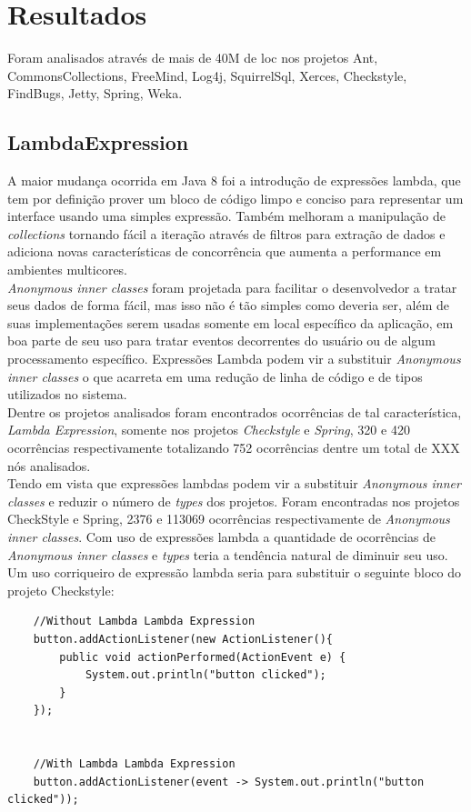 \chapter {Resultados}
Foram analisados através de mais de 40M de loc nos projetos Ant, CommonsCollections, FreeMind, Log4j, SquirrelSql, Xerces, Checkstyle, FindBugs, Jetty, Spring, Weka.\\

\section{LambdaExpression}
A maior mudança ocorrida em Java 8 foi a introdução de expressões lambda, que tem por definição prover um bloco de código limpo e conciso para representar um interface usando uma simples expressão. Também melhoram a manipulação de \textit{collections} tornando fácil a iteração através de filtros para extração de dados e adiciona novas características de concorrência que aumenta a performance em ambientes multicores.\\

\textit{Anonymous inner classes} foram projetada para facilitar o desenvolvedor a tratar seus dados de forma fácil, mas isso não é tão simples como deveria ser, além de suas implementações serem usadas somente em local específico da aplicação, em boa parte de seu uso para tratar eventos decorrentes do usuário ou de algum processamento específico. Expressões Lambda podem vir a substituir \textit{Anonymous inner classes} o que acarreta em uma redução de linha de código e de tipos utilizados no sistema.\\

Dentre os projetos analisados foram encontrados ocorrências de tal característica, \textit{Lambda Expression}, somente nos projetos \textit{Checkstyle} e \textit{Spring}, 320 e 420 ocorrências respectivamente totalizando 752 ocorrências dentre um total de XXX nós analisados.\\

Tendo em vista que expressões lambdas podem vir a substituir \textit{Anonymous inner classes} e reduzir o número de \textit{types} dos projetos. Foram encontradas nos projetos CheckStyle e Spring, 2376 e 113069 ocorrências respectivamente de \textit{Anonymous inner classes}. Com uso de expressões lambda a quantidade de ocorrências de \textit{Anonymous inner classes} e \textit{types} teria a tendência natural de diminuir seu uso.\\

Um uso corriqueiro de expressão lambda seria para substituir o seguinte bloco do projeto Checkstyle:
\begin{lstlisting}
	//Without Lambda Lambda Expression
	button.addActionListener(new ActionListener(){
		public void actionPerformed(ActionEvent e) {
			System.out.println("button clicked");
		}
	});


	//With Lambda Lambda Expression
	button.addActionListener(event -> System.out.println("button clicked"));
	
\end{lstlisting}

